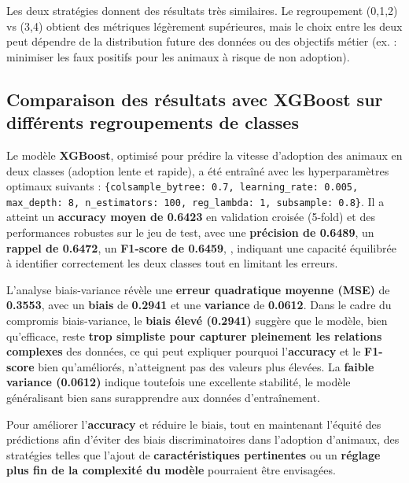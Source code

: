 \documentclass[a4paper,12pt]{article}
\begin{document}
Les deux stratégies donnent des résultats très similaires. Le regroupement (0,1,2) vs (3,4) obtient des métriques légèrement supérieures, mais le choix entre les deux peut dépendre de la distribution future des données ou des objectifs métier (ex. : minimiser les faux positifs pour les animaux à risque de non adoption).



\subsection{Comparaison des résultats avec XGBoost sur différents regroupements de classes}
 
Le modèle \textbf{XGBoost}, optimisé pour prédire la vitesse d'adoption des animaux en deux classes (adoption lente et rapide), a été entraîné avec les hyperparamètres optimaux suivants : \texttt{\{colsample\_bytree: 0.7, learning\_rate: 0.005, max\_depth: 8, n\_estimators: 100, reg\_lambda: 1, subsample: 0.8\}}. Il a atteint un \textbf{accuracy moyen de 0.6423} en validation croisée (5-fold) et des performances robustes sur le jeu de test, avec une \textbf{précision de 0.6489}, un \textbf{rappel de 0.6472}, un \textbf{F1-score de 0.6459}, , indiquant une capacité équilibrée à identifier correctement les deux classes tout en limitant les erreurs.
 
L'analyse biais-variance révèle une \textbf{erreur quadratique moyenne (MSE)} de \textbf{0.3553}, avec un \textbf{biais} de \textbf{0.2941} et une \textbf{variance} de \textbf{0.0612}. Dans le cadre du compromis biais-variance, le \textbf{biais élevé (0.2941)} suggère que le modèle, bien qu’efficace, reste \textbf{trop simpliste pour capturer pleinement les relations complexes} des données, ce qui peut expliquer pourquoi l’\textbf{accuracy} et le \textbf{F1-score} bien qu’améliorés, n’atteignent pas des valeurs plus élevées. La \textbf{faible variance (0.0612)} indique toutefois une excellente stabilité, le modèle généralisant bien sans surapprendre aux données d’entraînement.
 
Pour améliorer l’\textbf{accuracy} et réduire le biais, tout en maintenant l’équité des prédictions afin d’éviter des biais discriminatoires dans l’adoption d’animaux, des stratégies telles que l’ajout de \textbf{caractéristiques pertinentes} ou un \textbf{réglage plus fin de la complexité du modèle} pourraient être envisagées.
 
\end{document}
